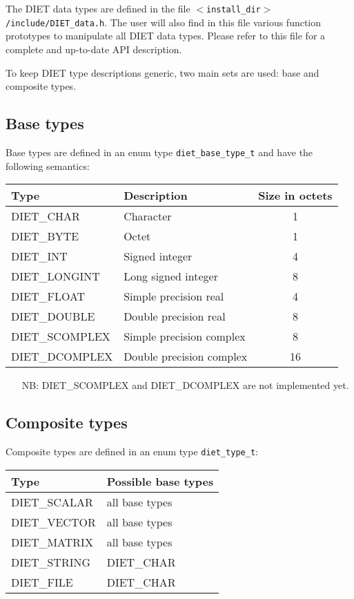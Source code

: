 The DIET data types are defined in the file
\texttt{$<$install\_dir$>$/include/DIET\_data.h}. The user will also find in
this file various function prototypes to manipulate all DIET data types. Please
refer to this file for a complete and up-to-date API description.

To keep DIET type descriptions generic, two main sets are used: base and
composite types.

\subsection{Base types}
\label{ssec:base}

Base types are defined in an enum type \texttt{diet\_base\_type\_t} and have the
following semantics:
\begin{center}
\footnotesize
\begin{tabular}{|l|l|c|}
\hline
\textbf{Type}&\textbf{Description}&\textbf{Size in octets}\\
\hline
\textsf{DIET\_CHAR}     & Character                &  1\\
\textsf{DIET\_BYTE}     & Octet                    &  1\\
\textsf{DIET\_INT}      & Signed integer           &  4\\
\textsf{DIET\_LONGINT}  & Long signed integer      &  8\\
\textsf{DIET\_FLOAT}    & Simple precision real    &  4\\
\textsf{DIET\_DOUBLE}   & Double precision real    &  8\\
\hline\hline
\textsf{DIET\_SCOMPLEX} & Simple precision complex &  8\\
\textsf{DIET\_DCOMPLEX} & Double precision complex & 16\\
\hline
\end{tabular}
\end{center}

\begin{itemize}
\item[NB:] \textsf{DIET\_SCOMPLEX} and \textsf{DIET\_DCOMPLEX} are not implemented yet.
\end{itemize}


\subsection{Composite types}
\label{ssec:complex}

Composite types are defined in an enum type \texttt{diet\_type\_t}:
\begin{center}
\footnotesize
\begin{tabular}{|l|l|}
\hline
\textbf{Type}&\textbf{Possible base types}\\
\hline
\textsf{DIET\_SCALAR} & all base types\\
\textsf{DIET\_VECTOR} & all base types\\
\textsf{DIET\_MATRIX} & all base types\\
\textsf{DIET\_STRING} & \textsf{DIET\_CHAR}\\
\textsf{DIET\_FILE}   & \textsf{DIET\_CHAR}\\
\hline
\end{tabular}
\end{center}

